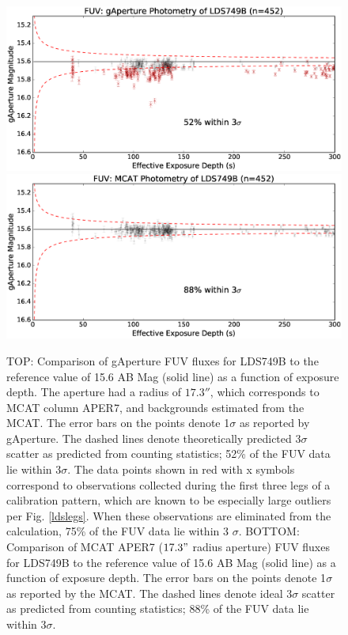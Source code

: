 \documentclass[preprint]{aastex}
\begin{document}
\begin{figure}[t!]
\begin{minipage}[c][11cm][c]{1.\textwidth}
\centering
\includegraphics[scale=0.625]{Fig07a.eps}
\includegraphics[scale=0.625]{Fig07b.eps}
\caption{TOP: Comparison of gAperture FUV fluxes for LDS749B to the reference value of 15.6 AB Mag (solid line) as a function of exposure depth. The aperture had a radius of $17.3''$, which corresponds to MCAT column APER7, and backgrounds estimated from the MCAT. The error bars on the points denote 1$\sigma$ as reported by gAperture. The dashed lines denote theoretically predicted 3$\sigma$ scatter as predicted from counting statistics; 52\% of the FUV data lie within 3$\sigma$. The data points shown in red with x symbols correspond to observations collected during the first three legs of a calibration pattern, which are known to be especially large outliers per Fig. \ref{ldslegs}. When these observations are eliminated from the calculation, 75\% of the FUV data lie within 3 $\sigma$. BOTTOM: Comparison of MCAT APER7 ($17.3"$ radius aperture) FUV fluxes for LDS749B to the reference value of 15.6 AB Mag (solid line) as a function of exposure depth. The error bars on the points denote 1$\sigma$ as reported by the MCAT. The dashed lines denote ideal 3$\sigma$ scatter as predicted from counting statistics; 88\% of the FUV data lie within 3$\sigma$.
\label{ldsabsphotfuv}}
\end{minipage}
\end{figure}
\end{document}
